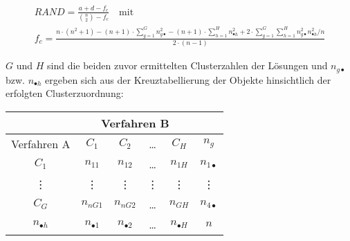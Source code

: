  \begin{gather}
 RAND = \frac{a+d-f_c}{\binom{n}{2}-f_c} \quad \text{mit} \\
 f_c = \frac{n\cdot(n^2+1)-(n+1)\cdot\sum_{g=1}^{G}n_{g \bullet}^2-(n+1)\cdot\sum_{h=1}^{H}n_{\bullet h}^2+2\cdot\sum_{g=1}^{G}\sum_{h=1}^{H}n_{g \bullet}^2n_{ \bullet h}^2/n}{2\cdot(n-1)}
 \end{gather}
 
 $G$ und $H$ sind die beiden zuvor ermittelten Clusterzahlen der Lösungen und $n_{g \bullet}$ bzw. $n_{ \bullet h}$ ergeben sich aus der Kreuztabellierung der Objekte hinsichtlich der erfolgten Clusterzuordnung: \\
 
\centering
\begin{tabular}{|c|c|c|c|c|c|} 
	\hline
	& \multicolumn{4}{c|}{Verfahren B} & \\ \hline
	Verfahren A & $C_1$ & $C_2$ & \dots & $C_H$ & $n_g$ \\ \hline
	$C_1$ & $n_{11}$ & $n_{12}$ & \dots & $n_{1H}$ & $n_{1 \bullet}$ \\
	\vdots & \vdots & \vdots & \vdots & \vdots & \vdots \\
	$C_G$ & $n_{nG1}$ & $n_{nG2}$ & \dots & $n_{GH}$ & $n_{4 \bullet}$ \\ \hline
	$n_{\bullet h}$ & $n_{\bullet 1}$ & $n_{\bullet 2}$ & \dots & $n_{\bullet H}$ & $n$ \\ \hline
\end{tabular}
\bigskip